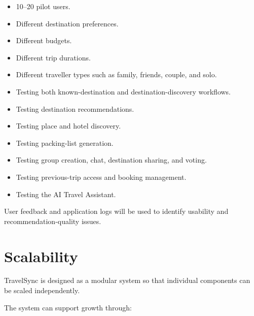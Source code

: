 \documentclass[11pt,a4paper]{article}
\begin{document}
\begin{itemize}

\item 10--20 pilot users.

\item Different destination preferences.

\item Different budgets.

\item Different trip durations.

\item Different traveller types such as family, friends, couple, and solo.

\item Testing both known-destination and destination-discovery workflows.

\item Testing destination recommendations.

\item Testing place and hotel discovery.

\item Testing packing-list generation.

\item Testing group creation, chat, destination sharing, and voting.

\item Testing previous-trip access and booking management.

\item Testing the AI Travel Assistant.

\end{itemize}

User feedback and application logs will be used to identify usability and recommendation-quality issues.



\section{Scalability}

TravelSync is designed as a modular system so that individual components can be scaled independently.

The system can support growth through:
\end{document}
